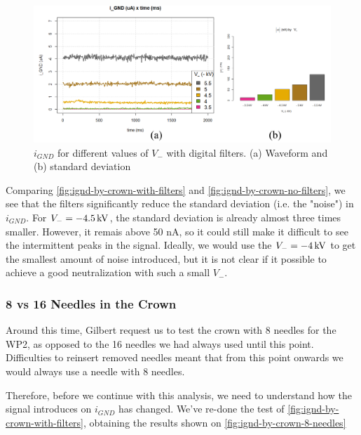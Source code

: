 \documentclass[oneside,12pt]{article}
\begin{document}
\begin{figure}[h!]
    \centering
    \includegraphics[width=1\textwidth,trim=1 1 1 1,clip]{figures/ignd-by-crown-with-filters.png}
    \caption{$i_{GND}$ for different values of $V_-$ with digital filters. (a) Waveform and (b) standard deviation}
    \label{fig:ignd-by-crown-with-filters}
\end{figure}

Comparing \autoref{fig:ignd-by-crown-with-filters} and \autoref{fig:ignd-by-crown-no-filters}, we see that the filters significantly 
reduce the standard deviation (i.e. the "noise") in $i_{GND}$. For $V_- = - 4.5 \,\mathrm{kV}$, the standard deviation is already almost 
three times smaller. However, it remais above 50 nA, so it could still make it difficult to see the intermittent peaks in the signal.
Ideally, we would use the $V_- = - 4 \,\mathrm{kV}$ to get the smallest amount of noise introduced, but it is not clear if it possible
to achieve a good neutralization with such a small $V_-$.

\subsubsection{8 vs 16 Needles in the Crown}

Around this time, Gilbert request us to test the crown with 8 needles for the WP2, as opposed to the 16 needles we had always used until 
this point. Difficulties to reinsert removed needles meant that from this point onwards we would always use a needle with 8 needles. 

Therefore, before we continue with this analysis, we need to understand how the signal introduces on $i_{GND}$ has changed. We've re-done 
the test of \autoref{fig:ignd-by-crown-with-filters}, obtaining the results shown on \autoref{fig:ignd-by-crown-8-needles}
\end{document}

